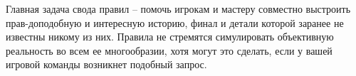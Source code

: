 \begin{tcolorbox}
    Главная задача свода правил – помочь игрокам и мастеру совместно выстроить прав-доподобную и интересную историю, финал и детали которой заранее не известны никому из них. Правила не стремятся симулировать объективную реальность во всем ее многообразии, хотя могут это сделать, если у вашей игровой команды возникнет подобный запрос.
\end{tcolorbox}




